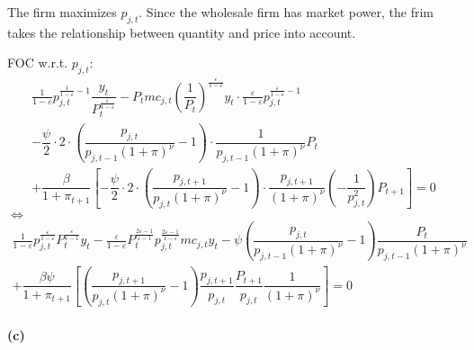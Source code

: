 \documentclass{article}
\begin{document}
The firm maximizes $p_{j,t}$. Since the wholesale firm has market power, the frim takes the relationship between quantity and price into account. 

FOC w.r.t. $p_{j,t}$:
\begin{multline*}
    \frac{1}{1-\varepsilon}p_{j,t}^{\frac{1}{1-\varepsilon}-1}\dfrac{y_{t}}{P_{t}^{\frac{\varepsilon}{1-\varepsilon}}}-P_{t}mc_{j,t}\left(\dfrac{1}{P_{t}}\right)^{\frac{\varepsilon}{1-\varepsilon}}y_{t}\cdot\frac{\varepsilon}{1-\varepsilon}p_{j,t}^{\frac{\varepsilon}{1-\varepsilon}-1}\\
    -\dfrac{\psi}{2}\cdot2\cdot\left(\dfrac{p_{j,t}}{p_{j,t-1}\left(1+\pi\right)^{\nu}}-1\right)\cdot\dfrac{1}{p_{j,t-1}\left(1+\pi\right)^{\nu}}P_{t}\\
    +\dfrac{\beta}{1+\pi_{t+1}}\left[-\dfrac{\psi}{2}\cdot2\cdot\left(\dfrac{p_{j,t+1}}{p_{j,t}\left(1+\pi\right)^{\nu}}-1\right)\cdot\dfrac{p_{j,t+1}}{\left(1+\pi\right)^{\nu}}\left(-\dfrac{1}{p^{2}_{j,t}}\right)P_{t+1}\right]=0
\end{multline*}
$\iff$
\begin{multline*}
    \frac{1}{1-\varepsilon}p_{j,t}^{\frac{\varepsilon}{1-\varepsilon}}P_{t}^{\frac{\varepsilon}{\varepsilon-1}}y_{t}-\frac{\varepsilon}{1-\varepsilon}P_{t}^{\frac{2\varepsilon-1}{\varepsilon-1}}p_{j,t}^{\frac{2\varepsilon-1}{1-\varepsilon}}mc_{j,t}y_{t}-\psi\left(\dfrac{p_{j,t}}{p_{j,t-1}\left(1+\pi\right)^{\nu}}-1\right)\dfrac{P_{t}}{p_{j,t-1}\left(1+\pi\right)^{\nu}}\\
    +\dfrac{\beta\psi}{1+\pi_{t+1}}\left[\left(\dfrac{p_{j,t+1}}{p_{j,t}\left(1+\pi\right)^{\nu}}-1\right)\dfrac{p_{j,t+1}}{p_{j,t}}\dfrac{P_{t+1}}{p_{j,t}}\dfrac{1}{\left(1+\pi\right)^{\nu}}\right]=0
\end{multline*}

\paragraph*{(c)}\mbox{}\\
\end{document}
